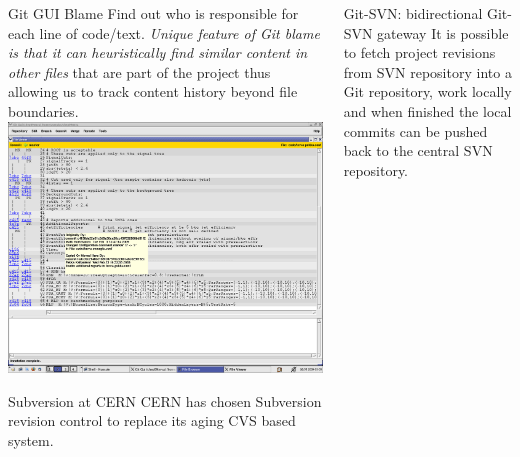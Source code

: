 \documentclass[final,hyperref={pdfpagelabels=false},notitlepage=true]{beamer}
\begin{document}
\begin{frame}{}
\begin{columns}[t]
\begin{column}{0.45\linewidth}
    \begin{block}{\large Git GUI Blame}
      Find out who is responsible for each line of code/text. \emph{Unique
      feature of Git blame is that it can heuristically find similar
      content in other files} that are part of the project thus
      allowing us to track content history beyond file boundaries.
      \includegraphics[scale=1.0]{images/git-gui-blame-content-copy-detection.png}
    \end{block}

    \begin{block}{\large Subversion at CERN}
      CERN has chosen Subversion revision control to replace its aging CVS based system.
    \end{block}

    \end{column}
      \begin{column}{0.45\linewidth}

	\begin{block}{\large Git-SVN: bidirectional Git-SVN gateway}
	  It is possible to fetch project revisions from SVN repository into a Git 
          repository, work locally and when finished the local commits
          can be pushed back to the central SVN repository.


\end{block}
\end{column}
\end{columns}
\end{frame}
\end{document}
